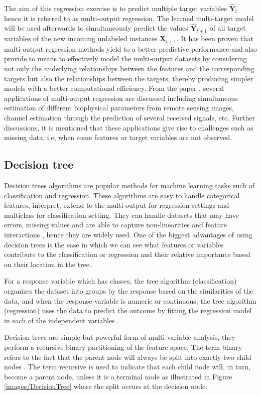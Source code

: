 The aim of this regression exercise is to predict multiple target variables $\widehat{\textbf{Y}}_{t}$  hence it is referred to as multi-output regression. The learned multi-target model will be used afterwards to simultaneously predict the values $\widehat{\textbf{Y}}_{t+1}$  of all target variables of the new incoming unlabeled instances $\textbf{X}_{t+1}$.  It has been proven that multi-output regression methods yield to a better predictive performance and also provide to means to effectively
model the multi-output datasets by considering not only the underlying relationships
between the features and the corresponding targets but also the relationships between
the targets, thereby producing simpler models with a better computational efficiency. From the paper \citep{borchani2015survey}, several applications of multi-output regression are discussed including simultaneous estimation of different biophysical parameters from remote sensing images, channel estimation through the prediction of several received signals, etc. Further discussions, it is mentioned that these applications give rise to challenges such as missing data, i.e, when some features or target variables are not observed.

\subsection{Decision tree}
\label{Dt}
Decision trees algorithms are popular methods for machine learning tasks such of classification and regression. These algorithms are easy to handle categorical features, interpret, extend to the multi-output for regression settings and multiclass for classification setting. They can handle datasets that may have errors, missing values and are able to capture non-linearities and feature interactions \citep{DT}, hence they are widely used. One of the biggest advantages of using decision trees is the ease in which we can see what features or variables contribute to the classification or regression and their relative importance based on their location in the tree.

For a response variable which
has classes, the tree algorithm (classification) organizes the dataset into groups by the response based on the similarities of the data, and when the response variable is numeric or continuous, the tree algorithm (regression) uses the data to predict the outcome by fitting the regression model in each of the independent variables \citep{morgan2014classification}.

Decision trees are simple but powerful form of multi-variable analysis, they  perform a recursive binary partitioning of the feature space. The term binary refers to the fact that the parent node  will always be split into exactly two child nodes \citep{moisen2008classification}. The term recursive is used to indicate that each child node will, in turn, become a parent node, unless it is a terminal node as illustrated in Figure \ref{images/DecisionTree} where the split occurs at the decision node.  


